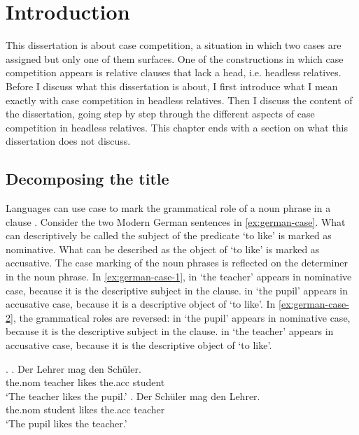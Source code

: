 
\chapter{Introduction}

This dissertation is about case competition, a situation in which two cases are assigned but only one of them surfaces. One of the constructions in which case competition appears is relative clauses that lack a head, i.e. headless relatives.
Before I discuss what this dissertation is about, I first introduce what I mean exactly with case competition in headless relatives.
Then I discuss the content of the dissertation, going step by step through the different aspects of case competition in headless relatives.
This chapter ends with a section on what this dissertation does not discuss.


\section{Decomposing the title}

Languages can use case to mark the grammatical role of a noun phrase in a clause \citep[cf.][]{moravcsik2009}. Consider the two Modern German sentences in \ref{ex:german-case}. What can descriptively be called the subject of the predicate  `to like' is marked as nominative. What can be described as the object of  `to like' is marked as accusative. The case marking of the noun phrases is reflected on the determiner in the noun phrase.
In \ref{ex:german-case-1},  in  `the teacher' appears in nominative case, because it is the descriptive subject in the clause.  in  `the pupil' appears in accusative case, because it is a descriptive object of  `to like'.
In \ref{ex:german-case-2}, the grammatical roles are reversed:  in  `the pupil' appears in nominative case, because it is the descriptive subject in the clause.  in  `the teacher' appears in accusative case, because it is the descriptive object of  `to like'.

\ex.\label{ex:german-case}
\ag. Der Lehrer mag den Schüler.\\
 the.\ac{nom} teacher likes the.\ac{acc} student\\
 `The teacher likes the pupil.'\label{ex:german-case-1}
\bg. Der Schüler mag den Lehrer.\\
 the.\ac{nom} student likes the.\ac{acc} teacher\\
 `The pupil likes the teacher.'\label{ex:german-case-2}

